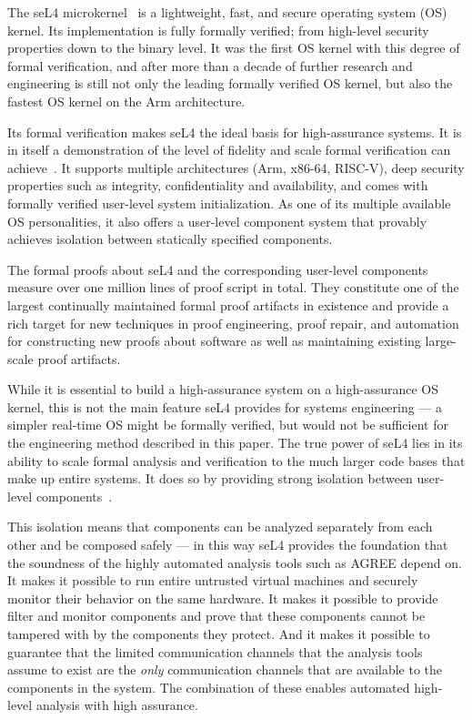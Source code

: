 
The seL4 microkernel~\cite{sel4-sosp09} is a lightweight, fast, and secure
operating system (OS) kernel. Its implementation is fully formally verified;
from high-level security properties down to the binary level. It was the first
OS kernel with this degree of formal verification, and after more than a decade
of further research and engineering is still not only the leading formally
verified OS kernel, but also the fastest OS kernel on the Arm architecture.

Its formal verification makes seL4 the ideal basis for high-assurance systems.
It is in itself a demonstration of the level of fidelity and scale formal
verification can achieve~\cite{sel4-tocs14}. It supports multiple architectures
(Arm, x86-64, RISC-V), deep security properties such as integrity,
confidentiality and availability, and comes with formally verified user-level
system initialization. As one of its multiple available OS personalities, it
also offers a user-level component system that provably achieves isolation
between statically specified components.

The formal proofs about seL4 and the corresponding user-level components measure
over one million lines of proof script in total. They constitute one of the
largest continually maintained formal proof artifacts in existence and provide a
rich target for new techniques in proof engineering, proof repair, and
automation for constructing new proofs about software as well as maintaining
existing large-scale proof artifacts.

While it is essential to build a high-assurance system on a high-assurance OS
kernel, this is not the main feature seL4 provides for systems engineering --- a
simpler real-time OS might be formally verified, but would not be sufficient for the
engineering method described in this paper. The true power of seL4 lies in its
ability to scale formal analysis and verification to the much larger code bases
that make up entire systems. It does so by providing strong isolation between
user-level components~\cite{sel4-cacm18}.

This isolation means that components can be analyzed separately from each other
and be composed safely --- in this way seL4 provides the foundation that the soundness of the highly
automated analysis tools such as AGREE depend on. It makes it possible to run
entire untrusted virtual machines and securely monitor their behavior on the
same hardware. It makes it possible to provide filter and monitor components and
prove that these components cannot be tampered with by the components they protect.
And it makes it possible to guarantee that the limited communication channels that the analysis tools
assume to exist are the \emph{only} communication channels that are available to the
components in the system. The combination of these enables automated
high-level analysis with high assurance.
